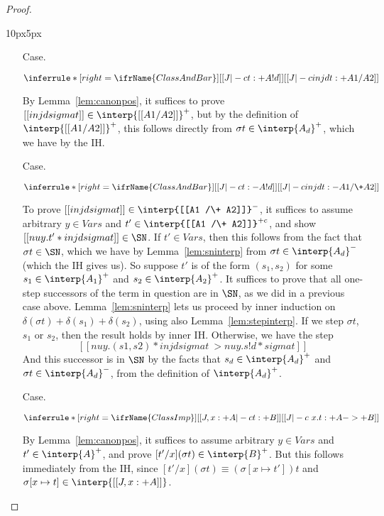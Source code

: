 \begin{proof}
\begin{changemargin}{10px}{5px}
\begin{itemize}
\item[Case.]\ 

\vspace{-.2cm}
\begin{center}
\begin{math}
\inferrule* [right=\ifrName{ClassAndBar}] {[[J |-c t : + A ! d]]}{[[J |-c inj d t : + A1 /\- A2]]}
\end{math}
\end{center}
By Lemma~\ref{lem:canonpos}, it suffices to prove $[[inj d sigma
t]]\in\interp{[[ A1 /\- A2]]}^+$, but by the definition of $\interp{[[
  A1 /\- A2]]}^+$, this follows directly from $\sigma
t\in\interp{A_d}^+$, which we have by the IH.

\item[Case.]\ 

\vspace{-.2cm}
\begin{center}
\begin{math}
\inferrule* [right=\ifrName{ClassAndBar}] {[[J |-c t : - A ! d]]}{[[J |-c inj d t : - A1 /\+ A2]]}
\end{math}
\end{center}
To prove $[[inj d sigma t]]\in\interp{[[A1 /\+ A2]]}^-$, it suffices
to assume arbitrary $y\in\textit{Vars}$ and $t'\in\interp{[[A1 /\+
  A2]]}^{+c}$, and show $[[ nu y . t' * inj d sigma t]]\in\SN$.  If
$t'\in\textit{Vars}$, then this follows from the fact that $\sigma
t\in\SN$, which we have by Lemma~\ref{lem:sninterp} from $\sigma
t\in\interp{A_d}^-$ (which the IH gives us).  So suppose $t'$ is of
the form $(s_1,s_2)$ for some $s_1\in\interp{A_1}^+$ and
$s_2\in\interp{A_2}^+$.  It suffices to prove that all one-step
successors of the term in question are in $\SN$, as we did in a
previous case above.  Lemma~\ref{lem:sninterp} lets us proceed by
inner induction on $\delta(\sigma t) + \delta(s_1) + \delta(s_2)$,
using also Lemma~\ref{lem:stepinterp}.  If we step $\sigma t$, $s_1$
or $s_2$, then the result holds by inner IH.  Otherwise, we have the
step
\[
[[ nu y . (s1,s2) * inj d sigma t ~> nu y . s ! d * sigma t]]
\]
And this successor is in $\SN$ by the facts that $s_d\in\interp{A_d}^+$
and $\sigma t\in\interp{A_d}^-$, from the definition of $\interp{A_d}^+$.

\item[Case.]\ 

\vspace{-.2cm}
\begin{center}
\begin{math}
\inferrule* [right=\ifrName{ClassImp}] {[[J , x : + A |-c t : + B]]}{[[J |-c \ x . t : + A ->+ B]]}
\end{math}
\end{center}
By Lemma~\ref{lem:canonpos}, it suffices to assume arbitrary $y\in\textit{Vars}$ and $t'\in\interp{A}^+$,
and prove $[t'/x](\sigma t)\in\interp{B}^+$.  But this follows immediately from the IH, since
$[t'/x](\sigma t)\equiv (\sigma[x\mapsto t']) t$ and $\sigma[x\mapsto t]\in\interp{[[J , x : + A]]}$.


\end{itemize}
\end{changemargin}
\end{proof}

